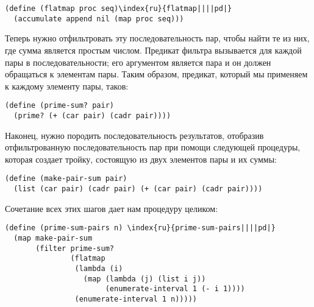 \begin{Verbatim}[fontsize=\small]
(define (flatmap proc seq)\index{ru}{flatmap||||pd|}
  (accumulate append nil (map proc seq)))
\end{Verbatim}
Теперь нужно отфильтровать эту последовательность пар, чтобы найти те
из них, где сумма является простым числом.  Предикат фильтра
вызывается для каждой пары в последовательности; его аргументом
является пара и он должен обращаться к элементам пары. Таким образом,
предикат, который мы применяем к каждому элементу пары, таков:

\begin{Verbatim}[fontsize=\small]
(define (prime-sum? pair)
  (prime? (+ (car pair) (cadr pair))))
\end{Verbatim}
Наконец, нужно породить последовательность результатов, отобразив
от\-фи\-льтро\-ван\-ную последовательность пар при помощи следующей процедуры, 
которая создает тройку, состоящую из двух элементов пары и их суммы:

\begin{Verbatim}[fontsize=\small]
(define (make-pair-sum pair)
  (list (car pair) (cadr pair) (+ (car pair) (cadr pair))))
\end{Verbatim}
Сочетание всех этих шагов дает нам процедуру целиком:

\begin{Verbatim}[fontsize=\small]
(define (prime-sum-pairs n) \index{ru}{prime-sum-pairs||||pd|}
  (map make-pair-sum
       (filter prime-sum?
               (flatmap
                (lambda (i)
                  (map (lambda (j) (list i j))
                       (enumerate-interval 1 (- i 1))))
                (enumerate-interval 1 n)))))
\end{Verbatim}

